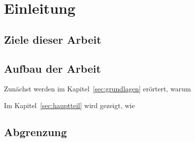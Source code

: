 \section{Einleitung}
\label{sec:einleitung}


\subsection{Ziele dieser Arbeit}


\subsection{Aufbau der Arbeit}

Zunächst werden im Kapitel~\ref{sec:grundlagen} erörtert, warum 

Im Kapitel~\ref{sec:hauptteil} wird gezeigt, wie 

\subsection{Abgrenzung}

